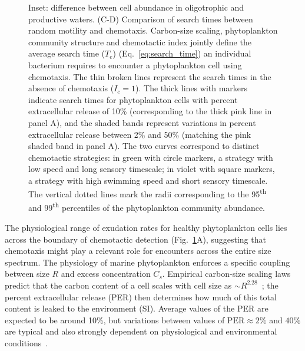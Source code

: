 \documentclass[9pt,twocolumn,twoside]{pnas-new}
\begin{document}
\begin{figure}
{        Inset: difference between cell abundance in oligotrophic and productive waters.
        (C-D) Comparison of search times between random motility and chemotaxis.
        Carbon-size scaling, phytoplankton community structure and chemotactic index jointly define the average search time ($T_e$) (Eq.~\ref{eq:search_time}) an individual bacterium requires to encounter a phytoplankton cell using chemotaxis.
        The thin broken lines represent the search times in the absence of chemotaxis ($I_c=1$).
        The thick lines with markers indicate search times for phytoplankton cells with percent extracellular release of 10\% (corresponding to the thick pink line in panel A), and the shaded bands represent variations in percent extracellular release between 2\% and 50\% (matching the pink shaded band in panel A).
        The two curves correspond to distinct chemotactic strategies: in green with circle markers, a strategy with low speed and long sensory timescale; in violet with square markers, a strategy with high swimming speed and short sensory timescale.
        The vertical dotted lines mark the radii corresponding to the 95\textsuperscript{th} and 99\textsuperscript{th} percentiles of the phytoplankton community abundance.
    }
    \label{fig:ecology}
\end{figure}



The physiological range of exudation rates for healthy phytoplankton cells lies across the boundary of chemotactic detection (Fig.~\ref{fig:ecology}A), suggesting that chemotaxis might play a relevant role for encounters across the entire size spectrum. The physiology of marine phytoplankton enforces a specific coupling between size $R$ and excess concentration $C_s$.
Empirical carbon-size scaling laws predict that the carbon content of a cell scales with cell size as $\sim R^{2.28}$~\cite{mullin1966relationship}; the percent extracellular release (PER) then determines how much of this total content is leaked to the environment (SI).
Average values of the PER are expected to be around 10\%, but variations between values of $\mathrm{PER}\approx 2\%$ and $40\%$ are typical and also strongly dependent on physiological and environmental conditions~\cite{maranon2004significance}.
\end{document}
